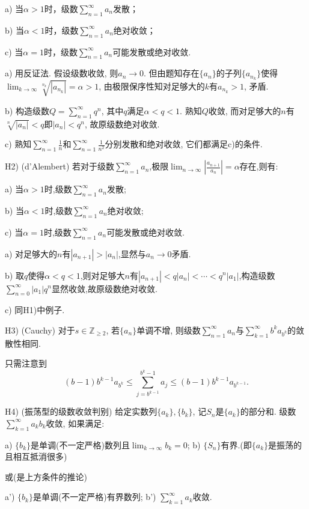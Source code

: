 	a) 当$\alpha >1$时，级数$\sum_{n=1}^{\infty} a_n$发散；
	
	b) 当$\alpha <1$时，级数$\sum_{n=1}^{\infty} a_n$绝对收敛；
	
	c) 当$\alpha =1$时，级数$\sum_{n=1}^{\infty} a_n$可能发散或绝对收敛.

\begin{solution}
	a) 用反证法. 假设级数收敛, 则$a_n \to 0$. 但由题知存在$\{ a_n \}$的子列$\{ a_{n_k} \}$使得$\lim_{k\to \infty} \sqrt[n_k]{|a_{n_k}|} = \alpha > 1$, 由极限保序性知对足够大的$k$有$a_{n_k}>1$, 矛盾.
	
	b) 构造级数$Q=\sum_{n=1}^{\infty} q^n$, 其中$q$满足$\alpha < q <1$. 熟知$Q$收敛, 而对足够大的$n$有$\sqrt[n]{|a_n|}<q$即$|a_n|<q^n$, 故原级数绝对收敛. 
	
	c) 熟知$\sum_{n=1}^{\infty} \frac{1}{n}$和$\sum_{n=1}^{\infty} \frac{1}{n^2}$分别发散和绝对收敛, 它们都满足c)的条件.
\end{solution}

H2) (d’Alembert) 若对于级数$\sum_{n=1}^{\infty} a_n$,极限$\lim_{n\to \infty}|\frac{a_{n+1}}{a_n} |=\alpha$存在,则有:
	
	a) 当$\alpha >1$时,级数$\sum_{n=1}^{\infty} a_n$发散;
	
	b) 当$\alpha <1$时,级数$\sum_{n=1}^{\infty} a_n$绝对收敛;
	
	c) 当$\alpha =1$时,级数$\sum_{n=1}^{\infty} a_n$可能发散或绝对收敛.
	
\begin{solution}
	a) 对足够大的$n$有$|a_{n+1}|>|a_n|$,显然与$a_n\to 0$矛盾.
	
	b) 取$q$使得$\alpha < q <1$,则对足够大$n$有$|a_{n+1}|<q|a_n|<\cdots < q^n|a_1|$,构造级数$\sum_{n=0}^{\infty} |a_1|q^n$显然收敛,故原级数绝对收敛.
	
	c) 同H1)中例子.
\end{solution}

H3) (Cauchy) 对于$s \in \mathbb{Z}_{\geq 2}$, 若$\{ a_n \}$单调不增, 则级数$\sum_{n=1}^{\infty} a_n$与$\sum_{k=1}^{\infty} b^k a_{b^k}$的敛散性相同. 

\begin{solution}
	只需注意到$$(b-1)b^{k-1}a_{b^k} \leq \sum_{j=b^{k-1}}^{b^k-1} a_j \leq (b-1)b^{k-1}a_{b^{k-1}}.$$
\end{solution}

H4) (振荡型的级数收敛判别) 给定实数列$\{ a_k \},\{ b_k \}$, 记$S_n$是$\{ a_k \}$的部分和. 级数$\sum_{k=1}^{\infty} a_kb_k$收敛, 如果满足: 

	a) $\{ b_k \}$是单调(不一定严格)数列且$\lim_{k\to \infty} b_k = 0$;  \qquad b) $\{ S_n \}$有界.(即$\{ a_k \}$是振荡的且相互抵消很多)
	
	或(是上方条件的推论)
	
	a') $\{ b_k \}$是单调(不一定严格)有界数列; \qquad b') $\sum_{k=1}^{\infty} a_k$收敛. 

















